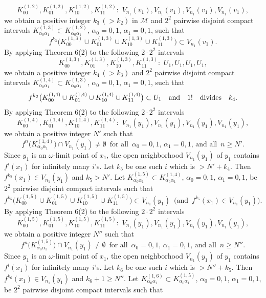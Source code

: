 \documentclass[12pt]{article}
\newcommand{\al}{\alpha}
\begin{document}
$$
K_{00}^{(1,2)}, K_{01}^{(1,2)}, K_{10}^{(1,2)}, K_{11}^{(1,2)}: \,\, V_{n_1}(v_1), V_{n_1}(v_1), V_{n_1}(v_1), V_{n_1}(v_1),
$$
we obtain a positive integer $k_3 \, (> k_2)$ in $\mathcal M$ and $2^2$ pairwise disjoint compact intervals $K_{\al_0\al_1}^{(1,3)} \subset K_{\al_0\al_1}^{(1,2)}$, $\al_0 = 0, 1$, $\al_1 = 0, 1$, such that 
$$
f^{k_3}\big(K_{00}^{(1,3)} \cup K_{01}^{(1,3)} \cup K_{10}^{(1,3)} \cup K_{11}^{(1,3)}\big) \subset V_{n_1}(v_1).%
$$
\indent By applying Theorem 6(2) to the following $2 \cdot 2^2$ intervals 
$$
K_{00}^{(1,3)}, K_{01}^{(1,3)}, K_{10}^{(1,3)}, K_{11}^{(1,3)}: \,\, U_1, U_1, U_1, U_1,
$$
we obtain a positive integer $k_4 \, (> k_3)$ and $2^2$ pairwise disjoint compact intervals $K_{\al_0\al_1}^{(1,4)} \subset K_{\al_0\al_1}^{(1,3)}$, $\al_0 = 0, 1$, $\al_1 = 0, 1$, such that 
$$
f^{k_3}\big(K_{00}^{(1,4)} \cup K_{01}^{(1,4)} \cup K_{10}^{(1,4)} \cup K_{11}^{(1,4)}\big) \subset U_1 \quad \text{and} \quad 1! \quad \text{divides} \quad k_4.\vspace{.15in}
$$
\indent By applying Theorem 6(2) to the following $2 \cdot 2^2$ intervals 
$$
K_{00}^{(1,4)}, K_{01}^{(1,4)}, K_{10}^{(1,4)}, K_{11}^{(1,4)}: \,\, V_{n_1}(y_1), V_{n_1}(y_1), V_{n_1}(y_1), V_{n_1}(y_1),
$$ 
we obtain a positive integer $N'$ such that 
$$
f^n\big(K_{\al_0\al_1}^{(1,4)}\big) \cap V_{n_1}(y_1) \ne \emptyset \,\,\, \text{for all} \,\,\, \al_0 = 0, 1, \, \al_1 = 0, 1, \, \text{and all} \,\,\, n \ge N'.
$$
\indent Since $y_1$ is an $\omega$-limit point of $x_1$, the open neighborhood $V_{n_1}(y_1)$ of $y_1$ contains $f^i(x_1)$ for infinitely many $i$'s.  Let $k_5$ be one such $i$ which is $> N'+k_4$.  Then $f^{k_5}(x_1) \in V_{n_1}(y_1)$ and $k_5 > N'$.  Let $K_{\al_0\al_1}^{(1,5)} \subset K_{\al_0\al_1}^{(1,4)}$, $\al_0 = 0, 1$, $\al_1 = 0, 1$, be $2^2$ pairwise disjoint compact intervals such that 
$$
f^{k_5}\big(K_{00}^{(1,5)} \cup K_{01}^{(1,5)} \cup K_{10}^{(1,5)} \cup K_{11}^{(1,5)}\big) \subset V_{n_1}(y_1) \,\,\, \big(\text{and} \,\,\, f^{k_5}(x_1) \in V_{n_1}(y_1)\big).
$$
\indent By applying Theorem 6(2) to the following $2 \cdot 2^2$ intervals 
$$
K_{00}^{(1,5)}, K_{01}^{(1,5)}, K_{10}^{(1,5)}, K_{11}^{(1,5)}: \,\, V_{n_1}(y_1), V_{n_1}(y_1), V_{n_1}(y_1), V_{n_1}(y_1),
$$
we obtain a positive integer $N''$ such that 
$$
f^n\big(K_{\al_0\al_1}^{(1,5)}\big) \cap V_{n_1}(y_1) \ne \emptyset \,\,\, \text{for all} \,\,\, \al_0 = 0, 1, \, \al_1 = 0, 1, \, \text{and all} \,\,\, n \ge N''.
$$\indent Since $y_1$ is an $\omega$-limit point of $x_1$, the open neighborhood $V_{n_1}(y_1)$ of $y_1$ contains $f^i(x_1)$ for infinitely many $i$'s.  Let $k_6$ be one such $i$ which is $> N''+k_5$.  Then $f^{k_6}(x_1) \in V_{n_1}(y_1)$ and $k_6+1 \ge N''$.  Let $K_{\al_0\al_1}^{(1,6)} \subset K_{\al_0\al_1}^{(1,5)}$, $\al_0 = 0, 1$, $\al_1 = 0, 1$, be $2^2$ pairwise disjoint compact intervals such that 
\end{document}
